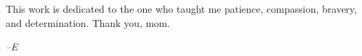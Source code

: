 
\begin{dedication}
This work is dedicated to the one who taught me patience, compassion, bravery, and determination. Thank you, mom.
  
\begin{center}
\emph{--E}
\end{center}
\end{dedication}
